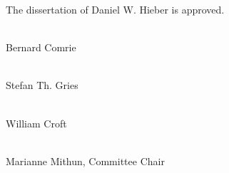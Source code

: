 \setlength{\parindent}{0em}

\newlength{\signaturepadding}
\setlength{\signaturepadding}{2.5em}
\thispagestyle{empty}

\begin{center}
  The dissertation of Daniel W. Hieber is approved.
\end{center}
\vspace{\signaturepadding}

\hrulefill\\
Bernard Comrie
\vspace{\signaturepadding}

\hrulefill\\
Stefan Th. Gries
\vspace{\signaturepadding}

\hrulefill\\
William Croft
\vspace{\signaturepadding}

\hrulefill\\
Marianne Mithun, Committee Chair
\vspace{\signaturepadding}

\begin{center}
  \thedate
\end{center}

\setlength{\parindent}{\defaultindent}
\restoregeometry
